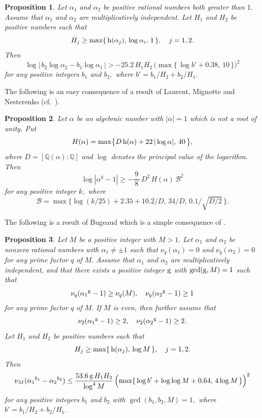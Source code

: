 \documentclass[11pt]{amsart}
\newtheorem{prop}{Proposition}[section]
\numberwithin{equation}{section}
\begin{document}
\begin{prop}\label{prop-comp}
Let $\alpha_1$ and $\alpha_2$ be positive rational numbers both greater than $1.$
Assume that $\alpha_1$ and $\alpha_2$ are multiplicatively independent.
Let $H_1$ and $H_2$ be positive numbers such that
\[
H_j \ge \max \{ \,{\rm h}(\alpha_j),\,\log \alpha_i,\, 1\,\}, \quad j=1,2.
\]
Then
\[
\log\big|\,b_2 \log {\alpha_2} - b_1 \log {\alpha_1}\,\big|>-25.2\,H_1 H_2\,\Big(\! \max \{\, \log b'+0.38,\,10\,\}\Bigr)^2
\]
for any positive integers $b_1$ and $b_2,$ where $b'=b_1/H_2+b_2/H_1.$
\end{prop}

The following is an easy consequence of a result of Laurent, Mignotte and Nesterenko \cite{LaMiNe} (cf.~\cite[Theorem 2.6]{Bu-book}).

\begin{prop} \label{bu-mig-thm2}
Let $\alpha$ be an algebraic number with $|\alpha|=1$ which is not a root of unity.
Put
\[
H(\alpha)=\max\bigr\{ D\,{\rm h}(\alpha)+22\,|\log \alpha|, \,40\,\bigr\},
\]
where $D=[\mathbb{Q}(\alpha):\mathbb{Q}]$ and $\log$ denotes the principal value of the logarithm.
Then
\[
\log|\alpha^k-1| \ge -\frac{\,9\,}{8}\,D^2\,H(\alpha)\,{\mathcal B}^2
\]
for any positive integer $k,$ where
\[
\mathcal B=\max\bigr\{ \log (k/25)+2.35+10.2/D, \, 34/D, \, 0.1/\sqrt{D/2}\, \bigr\}.
\]
\end{prop}

The following is a result of Bugeaud which is a simple consequence of \cite[Theorem 2;\,$\mu = 4$]{Bu-madic}.

\begin{prop} \label{prop-madic}
Let $M$ be a positive integer with $M>1.$
Let $\alpha_1$ and $\alpha_2$ be nonzero rational numbers with $\alpha_1 \ne \pm 1$ such that $\nu_q(\alpha_1)=0$ and $\nu_q(\alpha_2)=0$ for any prime factor $q$ of $M.$
Assume that $\alpha_1$ and $\alpha_2$ are multiplicatively independent, and that there exists a positive integer ${\rm g}$ with $\gcd({\rm g},M)=1$ such that
\[
\nu_q( {\alpha_1}^{{\rm g}}-1 ) \ge \nu_{q}(M), \quad \nu_q( {\alpha_2}^{{\rm g}}-1 ) \ge 1
\]
for any prime factor $q$ of $M.$
If $M$ is even, then further assume that
\[
\nu_2( {\alpha_1}^{{\rm g}}-1 ) \ge 2, \quad \nu_2( {\alpha_2}^{{\rm g}}-1 ) \ge 2.
\]
Let $H_1$ and $H_2$ be positive numbers such that
\[
H_j \ge \max \{ \,{\rm h}(\alpha_j),\, \log M \,\}, \quad j=1,2.
\]
Then
\[
\nu_M( {\alpha_1}^{b_1} - {\alpha_2}^{b_2}) \le \frac{53.6\,{\rm g}\,H_1 H_2}{\log^4 M}\, \Bigr(\!\max \{ \, \log b'+\log \log M+0.64,\,4 \log M \, \} \Big)^2
\]
for any positive integers $b_1$ and $b_2$ with $\gcd(b_1,b_2,M)=1,$ where $b'=b_1/H_2+b_2/H_1.$
\end{prop}
\end{document}

